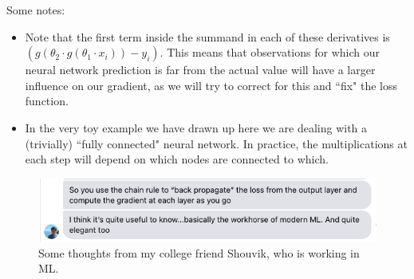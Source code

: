 \documentclass[10pt]{article}
\begin{document}
Some notes:
\begin{itemize}
	\item Note that the first term inside the summand in each of these derivatives is \(\left(g\left(\theta_2\cdot g(\theta_1\cdot x_i)\right)-y_i\right)\). This means that observations for which our neural network prediction is far from the actual value will have a larger influence on our gradient, as we will try to correct for this and ``fix" the loss function.
	\item In the very toy example we have drawn up here we are dealing with a (trivially) ``fully connected" neural network. In practice, the multiplications at each step will depend on which nodes are connected to which. 
\end{itemize}
\begin{figure}[htpb]
	\centering
	\includegraphics[width=0.8\linewidth]{shouvik.png}
	\caption{Some thoughts from my college friend Shouvik, who is working in ML.}%
	\label{fig:shouvik}
\end{figure}
\end{document}
